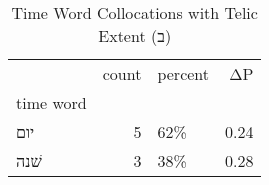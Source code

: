 \begin{table}[htbp!]
\centering
\caption{Time Word Collocations with Telic Extent (ב)}
\label{table:telicב_head_cpd}
\begin{tabular}{lrlr}
\toprule
{} &  count & percent &    ΔP \\
time word &        &         &       \\
\midrule
יום       &      5 &     62\% &  0.24 \\
שׁנה      &      3 &     38\% &  0.28 \\
\bottomrule
\end{tabular}
\end{table}
